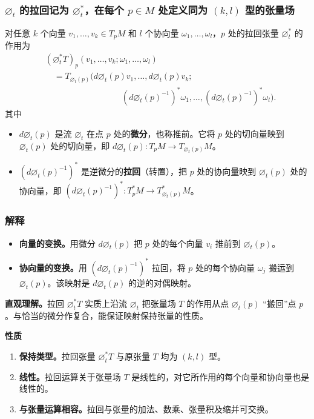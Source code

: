 \subsubsection{\texorpdfstring{$\varnothing_t$ 的拉回记为 $\varnothing_t^*$，在每个 $p\in M$ 处定义同为 $(k,l)$ 型的张量场}{流的拉回定义同型张量场}}
对任意 $k$ 个向量 $v_1,\ldots,v_k\in T_pM$ 和 $l$ 个协向量 $\omega_1,\ldots,\omega_l$，$p$ 处的拉回张量 $\varnothing_t^*$ 的作用为
\[
  \begin{aligned}
    &(\varnothing_t^*T)_p(v_1,\ldots,v_k;\omega_1,\ldots,\omega_l)\\
    &\quad=T_{\varnothing_t(p)}\bigl(d\varnothing_t(p)v_1,\ldots,d\varnothing_t(p)v_k;\\
    &\hspace{9em}(d\varnothing_t(p)^{-1})^*\omega_1,\ldots,
               (d\varnothing_t(p)^{-1})^*\omega_l\bigr).
  \end{aligned}
\]
其中
\begin{itemize}
  \item $d\varnothing_t(p)$ 是流 $\varnothing_t$ 在点 $p$ 处的\textbf{微分}，也称推前。它将 $p$ 处的切向量映到 $\varnothing_t(p)$ 处的切向量，即
  $d\varnothing_t(p)\colon T_pM\to T_{\varnothing_t(p)}M$。
  \item $(d\varnothing_t(p)^{-1})^*$ 是逆微分的\textbf{拉回}（转置），把 $p$ 处的协向量映到 $\varnothing_t(p)$ 处的协向量，即
  $(d\varnothing_t(p)^{-1})^*\colon T_p^*M\to T_{\varnothing_t(p)}^*M$。
\end{itemize}

\subsubsection{解释}
\begin{itemize}
  \item \textbf{向量的变换。}用微分 $d\varnothing_t(p)$ 把 $p$ 处的每个向量 $v_i$ 推前到 $\varnothing_t(p)$。
  \item \textbf{协向量的变换。}用 $(d\varnothing_t(p)^{-1})^*$ 拉回，将 $p$ 处的每个协向量 $\omega_j$ 搬运到 $\varnothing_t(p)$。该映射是 $d\varnothing_t(p)$ 的逆的对偶映射。
\end{itemize}

\textbf{直观理解。}拉回 $\varnothing_t^*T$ 实质上沿流 $\varnothing_t$ 把张量场 $T$ 的作用从点 $\varnothing_t(p)$ “搬回”点 $p$。与恰当的微分作复合，能保证映射保持张量的性质。

\textbf{性质}
\begin{enumerate}
  \item \textbf{保持类型。}拉回张量 $\varnothing_t^*T$ 与原张量 $T$ 均为 $(k,l)$ 型。
  \item \textbf{线性。}拉回运算关于张量场 $T$ 是线性的，对它所作用的每个向量和协向量也是线性的。
  \item \textbf{与张量运算相容。}拉回与张量的加法、数乘、张量积及缩并可交换。
\end{enumerate}

